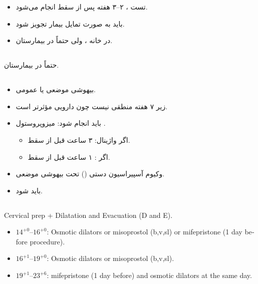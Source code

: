 \documentclass[12pt,a4paper]{article}
\begin{document}
\begin{itemize}
\item تست ، ۲–۳ هفته پس از سقط انجام می‌شود.
\item {} باید به صورت تمایل بیمار تجویز شود.
\item {} در خانه ، ولی \Abortionmath{10\leq} حتماً در بیمارستان.
\end{itemize}

\subsection*{ }
حتماً در بیمارستان.

\subsection*{}
\begin{itemize}
\item بیهوشی موضعی یا عمومی.
\item زیر ۷ هفته منطقی نیست چون دارویی مؤثرتر است.
\item {} باید انجام شود: میزوپروستول .
  \begin{itemize}
  \item اگر واژینال: ۳ ساعت قبل از سقط.
  \item اگر : ۱ ساعت قبل از سقط.
  \end{itemize}
\item وکیوم آسپیراسیون دستی () تحت بیهوشی موضعی.
\item {} باید  شود.
\end{itemize}

\subsection*{ }
\begin{latin}
Cervical prep + Dilatation and Evacuation (D and E).
\begin{itemize}
\item \(14^{+0}\text{--}16^{+0}\): Osmotic dilators or misoprostol (b,v,sl) or mifepristone (1 day before procedure).
\item \(16^{+1}\text{--}19^{+0}\): Osmotic dilators or misoprostol (b,v,sl).
\item \(19^{+1}\text{--}23^{+6}\): mifepristone (1 day before) and osmotic dilators at the same day.
\end{itemize}
\end{latin}
\end{document}
